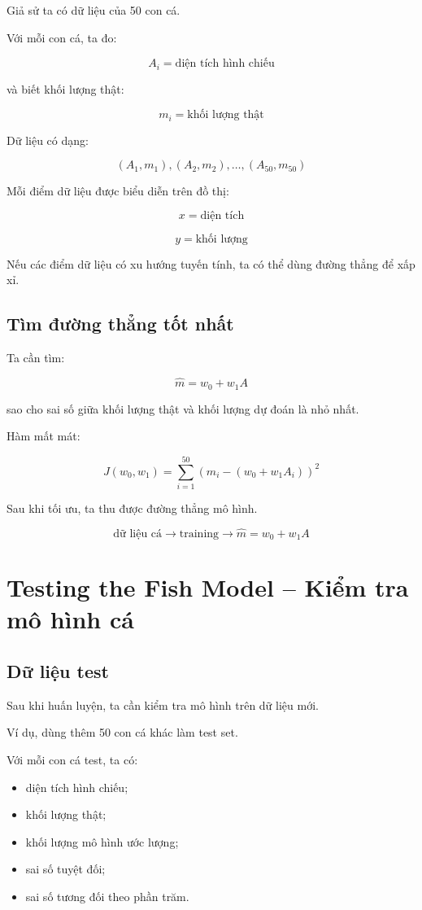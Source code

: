 Giả sử ta có dữ liệu của 50 con cá.

Với mỗi con cá, ta đo:

\[
    A_i = \text{diện tích hình chiếu}
\]

và biết khối lượng thật:

\[
    m_i = \text{khối lượng thật}
\]

Dữ liệu có dạng:

\[
    (A_1,m_1),(A_2,m_2),\ldots,(A_{50},m_{50})
\]

Mỗi điểm dữ liệu được biểu diễn trên đồ thị:

\[
    x = \text{diện tích}
\]

\[
    y = \text{khối lượng}
\]

Nếu các điểm dữ liệu có xu hướng tuyến tính, ta có thể dùng đường thẳng để xấp xỉ.

\subsection{Tìm đường thẳng tốt nhất}

Ta cần tìm:

\[
    \hat{m}=w_0+w_1A
\]

sao cho sai số giữa khối lượng thật và khối lượng dự đoán là nhỏ nhất.

Hàm mất mát:

\[
    J(w_0,w_1)
    =
    \sum_{i=1}^{50}
    \left(
    m_i-(w_0+w_1A_i)
    \right)^2
\]

Sau khi tối ưu, ta thu được đường thẳng mô hình.

\[
    \text{dữ liệu cá}
    \rightarrow
    \text{training}
    \rightarrow
    \hat{m}=w_0+w_1A
\]

\section{Testing the Fish Model -- Kiểm tra mô hình cá}

\subsection{Dữ liệu test}

Sau khi huấn luyện, ta cần kiểm tra mô hình trên dữ liệu mới.

Ví dụ, dùng thêm 50 con cá khác làm test set.

Với mỗi con cá test, ta có:

\begin{itemize}
    \item diện tích hình chiếu;
    \item khối lượng thật;
    \item khối lượng mô hình ước lượng;
    \item sai số tuyệt đối;
    \item sai số tương đối theo phần trăm.
\end{itemize}


